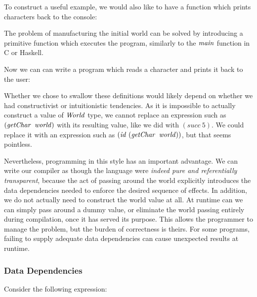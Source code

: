 To construct a useful example, we would also like to have a function which prints characters back to the console:

\code{
	$\iputChar :: \iChar \to \iWorld \to \iWorld$
}

The problem of manufacturing the initial world can be solved by introducing a primitive function which executes the program, similarly to the $\operatorname{\mathit{main}}$ function in C or Haskell.

\code{
	$\irunProg :: (\iWorld \to \iWorld) \to ()$
}

\clearpage{}
Now we can can write a program which reads a character and prints it back to the user:


Whether we chose to swallow these definitions would likely depend on whether we had constructivist or intuitionistic tendencies. As it is impossible to actually construct a value of $\operatorname{\mathit{World}}$ type, we cannot replace an expression such as $(\igetChar \ \iworld)$ with its resulting value, like we did with $(succ \ 5)$. We could replace it with an expression such as $(\operatorname{\mathit{id}} \ (\operatorname{\mathit{getChar}} \ \operatorname{\mathit{world}}))$, but that seems pointless.  

Nevertheless, programming in this style has an important advantage. We can write our compiler as though the language were \emph{indeed pure and referentially transparent}, because the act of passing around the world explicitly introduces the data dependencies needed to enforce the desired sequence of effects. In addition, we do not actually need to construct the world value at all. At runtime can we can simply pass around a dummy value, or eliminate the world passing entirely during compilation, once it has served its purpose. This allows the programmer to manage the problem, but the burden of correctness is theirs. For some programs, failing to supply adequate data dependencies can cause unexpected results at runtime.

\subsubsection{Data Dependencies}
Consider the following expression:

